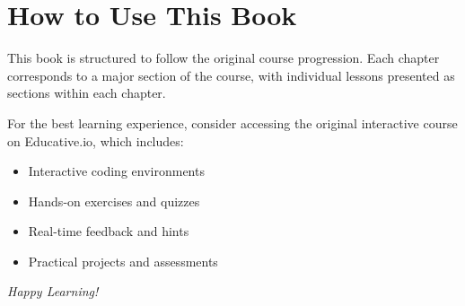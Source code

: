 \documentclass[../main.tex]{subfiles}
\begin{document}
\section*{How to Use This Book}
This book is structured to follow the original course progression. Each chapter corresponds to a major section of the course, with individual lessons presented as sections within each chapter.

For the best learning experience, consider accessing the original interactive course on Educative.io, which includes:
\begin{itemize}
    \item Interactive coding environments
    \item Hands-on exercises and quizzes
    \item Real-time feedback and hints
    \item Practical projects and assessments
\end{itemize}

\vspace{2cm}
\textit{Happy Learning!}
\end{document}
